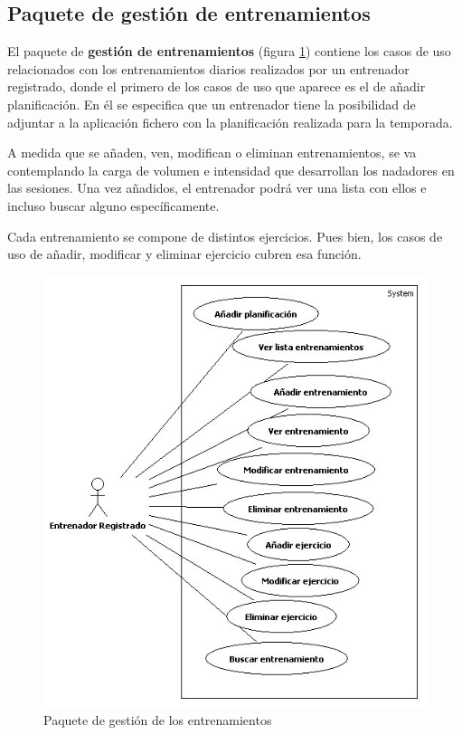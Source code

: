 	
	\subsection{Paquete de gestión de entrenamientos} %
		\label{sub:paquete_de_gestion_de_entrenamientos}
		
		El paquete de {\bf gestión de entrenamientos} (figura \ref{fig:analisis_gestion_entrenamientos}) contiene los casos de uso relacionados con los entrenamientos diarios realizados por un entrenador registrado, donde el primero de los casos de uso que aparece es el de añadir planificación. En él se especifica que un entrenador tiene la posibilidad de adjuntar a la aplicación fichero con la planificación realizada para la temporada.
		
		A medida que se añaden, ven, modifican o eliminan entrenamientos, se va contemplando la carga de volumen e intensidad que desarrollan los nadadores en las sesiones. Una vez añadidos, el entrenador podrá ver una lista con ellos e incluso buscar alguno específicamente.
		
		Cada entrenamiento se compone de distintos ejercicios. Pues bien, los casos de uso de añadir, modificar y eliminar ejercicio cubren esa función. 
		
		\begin{figure}[H]
		  \centering
		    \includegraphics[width=13cm]{./eps/casos_uso/gestion_entrenamientos.eps}
		  \caption{Paquete de gestión de los entrenamientos}
		  \label{fig:analisis_gestion_entrenamientos}
		\end{figure}
	
